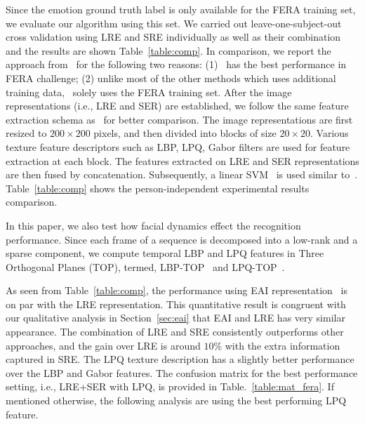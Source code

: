 \documentclass[journal]{IEEEtran}
\begin{document}
Since the emotion ground truth label is only available for the FERA training set, we evaluate our algorithm using this set. We carried out leave-one-subject-out cross validation using LRE and SRE individually as well as their combination and the results are shown Table~\ref{table:comp}. In comparison, we report the approach from~\cite{Yang_SMCB12} for the following two reasons: (1)~\cite{Yang_SMCB12} has the best performance in FERA challenge; (2) unlike most of the other methods which uses additional training data,~\cite{Yang_SMCB12} solely uses the FERA training set. After the image representations (i.e., LRE and SER) are established, we follow the same feature extraction schema as~\cite{Valstar12}\cite{Yang_SMCB12} for better comparison. The image representations are first resized to $200\times200$ pixels, and then divided into blocks of size $20\times20$. Various texture feature descriptors such as LBP, LPQ, Gabor filters are used for feature extraction at each block. The features extracted on LRE and SER representations are then fused by concatenation. Subsequently, a linear SVM~\cite{libsvm} is used similar to~\cite{Valstar12}\cite{Yang_SMCB12}. Table~\ref{table:comp} shows the person-independent experimental results comparison. 

In this paper, we also test how facial dynamics effect the recognition performance. Since each frame of a sequence is decomposed into a low-rank and a sparse component, we compute temporal LBP and LPQ features in Three Orthogonal Planes (TOP), termed, LBP-TOP~\cite{Zhao_PAMI07} and LPQ-TOP~\cite{LPQ-TOP}. 


As seen from Table~\ref{table:comp}, the performance using EAI representation~\cite{Yang_SMCB12} is on par with the LRE representation. This quantitative result is congruent with our qualitative analysis in Section~\ref{sec:eai} that EAI and LRE has very similar appearance. The combination of LRE and SRE consistently outperforms other approaches, and the gain over LRE is around $10\%$ with the extra information captured in SRE. The LPQ texture description has a slightly better performance over the LBP and Gabor features. The confusion matrix for the best performance setting, i.e., LRE+SER with LPQ, is provided in Table.~\ref{table:mat_fera}. If mentioned otherwise, the following analysis are using the best performing LPQ feature. 
\end{document}
